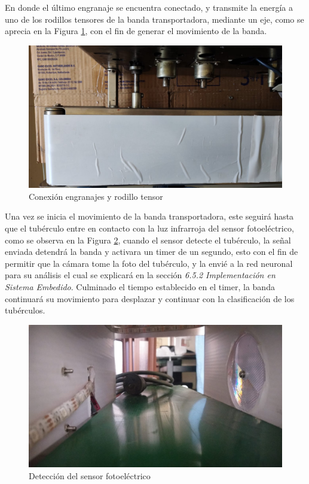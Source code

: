 En donde el último engranaje se encuentra conectado, y transmite la energía a uno de los rodillos tensores de la banda transportadora, mediante un eje, como se aprecia en la Figura \ref{fig:eje}, con el fin de generar el movimiento de la banda. 

\begin{figure}[ht]
	\centering
	\includegraphics[angle=270, scale=0.21]{Figs/202.jpg}
	\caption{Conexión engranajes y rodillo tensor}
	\label{fig:eje}
\end{figure}


Una vez se inicia el movimiento de la banda transportadora, este seguirá hasta que el tubérculo entre en contacto con la luz infrarroja del sensor fotoeléctrico, como se observa en la Figura \ref{fig:sensor}, cuando el sensor detecte el tubérculo, la señal enviada detendrá la banda y activara un timer de un segundo, esto con el fin de permitir que la cámara tome la foto del tubérculo, y la envié a la red neuronal para su análisis el cual se explicará en la sección \textit{6.5.2 Implementación en Sistema Embedido}. Culminado el tiempo establecido en el timer, la banda continuará su movimiento para desplazar y continuar con la clasificación de los tubérculos.

\newpage
\begin{figure}[ht]
	\centering
	\includegraphics[scale=0.15]{Figs/203.jpg}
	\caption{Detección del sensor fotoeléctrico}
	\label{fig:sensor}
\end{figure}


